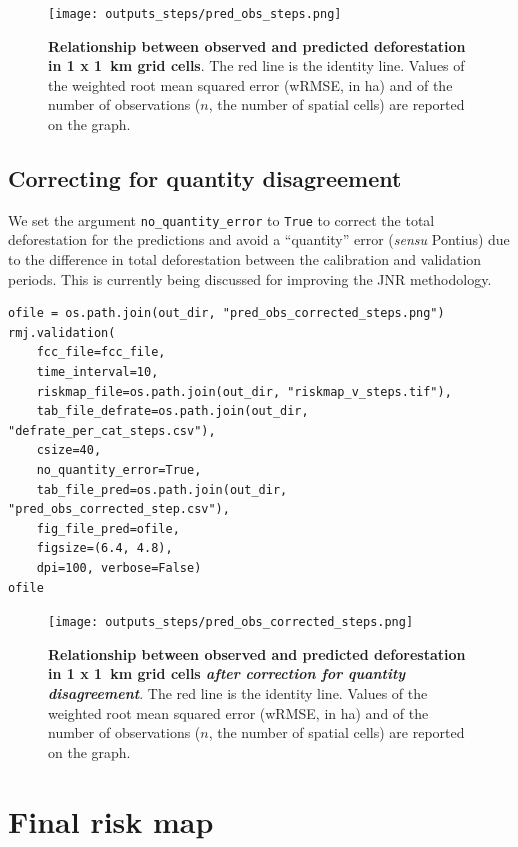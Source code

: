 \documentclass[paper=a4, 12pt, DIV=12]{scrartcl}
\begin{document}
\begin{figure}[H]
\centering
\texttt{[image: outputs\_steps/pred\_obs\_steps.png]}
\caption{\label{fig:org85ee330}\textbf{Relationship between observed and predicted deforestation in 1 x 1 km grid cells}. The red line is the identity line. Values of the weighted root mean squared error (wRMSE, in ha) and of the number of observations (\(n\), the number of spatial cells) are reported on the graph.}
\end{figure}

\subsection{Correcting for quantity disagreement}
\label{sec:org50de9fc}

We set the argument \texttt{no\_quantity\_error} to \texttt{True} to correct the total deforestation for the predictions and avoid a ``quantity'' error (\emph{sensu} Pontius) due to the difference in total deforestation between the calibration and validation periods. This is currently being discussed for improving the JNR methodology.

\begin{verbatim}
ofile = os.path.join(out_dir, "pred_obs_corrected_steps.png")
rmj.validation(
    fcc_file=fcc_file,
    time_interval=10,
    riskmap_file=os.path.join(out_dir, "riskmap_v_steps.tif"),
    tab_file_defrate=os.path.join(out_dir, "defrate_per_cat_steps.csv"),
    csize=40,
    no_quantity_error=True,
    tab_file_pred=os.path.join(out_dir, "pred_obs_corrected_step.csv"),
    fig_file_pred=ofile,
    figsize=(6.4, 4.8),
    dpi=100, verbose=False)
ofile
\end{verbatim}

\begin{figure}[H]
\centering
\texttt{[image: outputs\_steps/pred\_obs\_corrected\_steps.png]}
\caption{\label{fig:org17935f6}\textbf{Relationship between observed and predicted deforestation in 1 x 1 km grid cells \emph{after correction for quantity disagreement}}. The red line is the identity line. Values of the weighted root mean squared error (wRMSE, in ha) and of the number of observations (\(n\), the number of spatial cells) are reported on the graph.}
\end{figure}

\section{Final risk map}
\label{sec:org8d57ee3}
\end{document}
